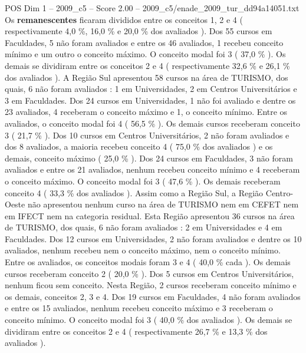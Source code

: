 \begin{textsample}{POS Dim 1 – 2009\_c5 – Score 2.00 – 2009\_c5/enade\_2009\_tur\_dd94a14051.txt}
Os \textbf{remanescentes} ficaram divididos entre os conceitos 1, 2 e 4 ( respectivamente 4,0 \%, 16,0 \% e 20,0 \% dos avaliados ).
Dos 55 cursos em Faculdades, 5 não foram avaliados e entre os 46 avaliados, 1 recebeu conceito mínimo e um outro o conceito máximo.
O conceito modal foi 3 ( 37,0 \% ).
Os demais se dividiram entre os conceitos 2 e 4 ( respectivamente 32,6 \% e 26,1 \% dos avaliados ).
A Região Sul apresentou 58 cursos na área de TURISMO, dos quais, 6 não foram avaliados : 1 em Universidades, 2 em Centros Universitários e 3 em Faculdades.
Dos 24 cursos em Universidades, 1 não foi avaliado e dentre os 23 avaliados, 4 receberam o conceito máximo e 1, o conceito mínimo.
Entre os avaliados, o conceito modal foi 4 ( 56,5 \% ).
Os demais cursos receberam conceito 3 ( 21,7 \% ).
Dos 10 cursos em Centros Universitários, 2 não foram avaliados e dos 8 avaliados, a maioria recebeu conceito 4 ( 75,0 \% dos avaliados ) e os demais, conceito máximo ( 25,0 \% ).
Dos 24 cursos em Faculdades, 3 não foram avaliados e entre os 21 avaliados, nenhum recebeu conceito mínimo e 4 receberam o conceito máximo.
O conceito modal foi 3 ( 47,6 \% ).
Os demais receberam conceito 4 ( 33,3 \% dos avaliados ).
Assim como a Região Sul, a Região Centro-Oeste não apresentou nenhum curso na área de TURISMO nem em CEFET nem em IFECT nem na categoria residual.
Esta Região apresentou 36 cursos na área de TURISMO, dos quais, 6 não foram avaliados : 2 em Universidades e 4 em Faculdades.
Dos 12 cursos em Universidades, 2 não foram avaliados e dentre os 10 avaliados, nenhum recebeu nem o conceito máximo, nem o conceito mínimo.
Entre os avaliados, os conceitos modais foram 3 e 4 ( 40,0 \% cada ).
Os demais cursos receberam conceito 2 ( 20,0 \% ).
Dos 5 cursos em Centros Universitários, nenhum ficou sem conceito.
Nesta Região, 2 cursos receberam conceito mínimo e os demais, conceitos 2, 3 e 4.
Dos 19 cursos em Faculdades, 4 não foram avaliados e entre os 15 avaliados, nenhum recebeu conceito máximo e 3 receberam o conceito mínimo.
O conceito modal foi 3 ( 40,0 \% dos avaliados ).
Os demais se dividiram entre os conceitos 2 e 4 ( respectivamente 26,7 \% e 13,3 \% dos avaliados ).

\end{textsample}
